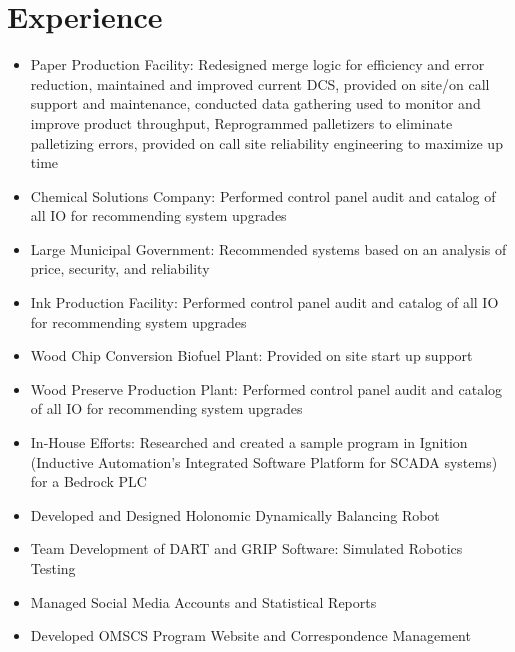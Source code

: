 \documentclass[10pt,letterpaper,sans]{moderncv}        %
\begin{document}
\makecvtitle

\vspace{-10mm}

\section{Experience}

\begin{itemize}
\item Paper Production Facility: Redesigned merge logic for efficiency and error reduction, maintained and improved current DCS, provided on site/on call support and maintenance, conducted data gathering used to monitor and improve product throughput, Reprogrammed palletizers to eliminate palletizing errors, provided on call site reliability engineering to maximize up time
\item Chemical Solutions Company: Performed control panel audit and catalog of all IO for recommending system upgrades
\item Large Municipal Government: Recommended systems based on an analysis of price, security, and reliability
\item Ink Production Facility: Performed control panel audit and catalog of all IO for recommending system upgrades
\item Wood Chip Conversion Biofuel Plant: Provided on site start up support
\item Wood Preserve Production Plant: Performed control panel audit and catalog of all IO for recommending system upgrades
\item In-House Efforts: Researched and created a sample program in Ignition (Inductive Automation’s Integrated Software Platform for SCADA systems) for a Bedrock PLC
\end{itemize}

\begin{itemize}
\item Developed and Designed Holonomic Dynamically Balancing Robot
\item Team Development of DART and GRIP Software: Simulated Robotics Testing
\end{itemize}

\begin{itemize}
\item Managed Social Media Accounts and Statistical Reports
\item Developed OMSCS Program Website and Correspondence Management
\end{itemize}
\end{document}
